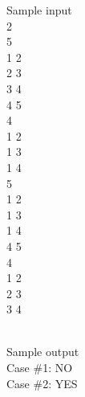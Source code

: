    Sample input   
\\   2   
\\   5   
\\   1 2   
\\   2 3   
\\   3 4   
\\   4 5   
\\   4   
\\   1 2   
\\   1 3   
\\   1 4   
\\   5   
\\   1 2   
\\   1 3   
\\   1 4   
\\   4 5   
\\   4   
\\   1 2   
\\   2 3   
\\   3 4  


\\   Sample output   
\\   Case \#1: NO   
\\   Case \#2: YES  

